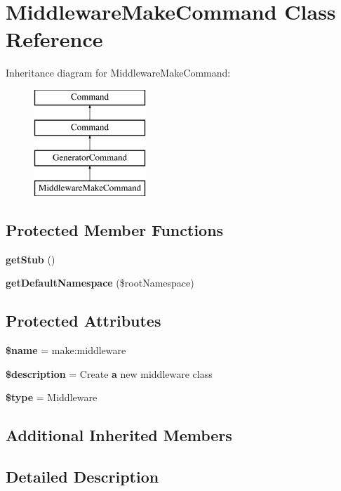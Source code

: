 \section{Middleware\+Make\+Command Class Reference}
\label{class_illuminate_1_1_routing_1_1_console_1_1_middleware_make_command}
Inheritance diagram for Middleware\+Make\+Command\+:\begin{figure}[H]
\begin{center}
\leavevmode
\includegraphics[height=4.000000cm]{class_illuminate_1_1_routing_1_1_console_1_1_middleware_make_command}
\end{center}
\end{figure}
\subsection*{Protected Member Functions}
\begin{DoxyCompactItemize}
\item 
{\bf get\+Stub} ()
\item 
{\bf get\+Default\+Namespace} (\$root\+Namespace)
\end{DoxyCompactItemize}
\subsection*{Protected Attributes}
\begin{DoxyCompactItemize}
\item 
{\bf \$name} = \textquotesingle{}make\+:middleware\textquotesingle{}
\item 
{\bf \$description} = \textquotesingle{}Create {\bf a} new middleware class\textquotesingle{}
\item 
{\bf \$type} = \textquotesingle{}Middleware\textquotesingle{}
\end{DoxyCompactItemize}
\subsection*{Additional Inherited Members}


\subsection{Detailed Description}


